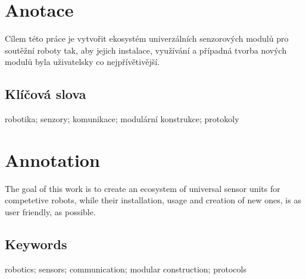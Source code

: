\documentclass{template/socthesis}
\author{Tomáš Rohlínek}
\begin{document}
	\maketitle
	
	
	
	\pagestyle{empty}
	
	\section*{Anotace}
	Cílem této práce je vytvořit ekosystém univerzálních senzorových modulů pro soutěžní roboty tak, aby jejich instalace, využívání a případná tvorba nových modulů byla uživatelsky co nejpřívětivější.
	
	\subsection*{Klíčová slova}
	robotika; senzory; komunikace; modulární konstrukce; protokoly
	
	\vspace{20mm}
	
	\section*{Annotation}
	The goal of this work is to create an ecosystem of universal sensor units for competetive robots, while their installation, usage and creation of new ones, is as user friendly, as possible. 
	
	\subsection*{Keywords}
	robotics; sensors; communication; modular construction; protocols
	
	\newpage
	\pagestyle{plain}
	
	\tableofcontents %
	
	\setcounter{figure}{0}
	\setcounter{table}{0}
	\newpage
	
	
	
	
	
	
	
\end{document}
